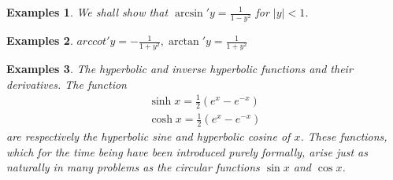 \documentclass[a4paper,12pt]{article} %
\newtheorem{example}{Examples}
\begin{document}
\begin{example}
    We shall show that $\arcsin'y = \frac{1}{1-y^2}$ for $|y| < 1$.
\end{example}

\begin{example}
    $\displaystyle arccot'y = -\frac{1}{1+y^2}, \arctan'y = \frac{1}{1+y^2}$
\end{example}

\begin{example}
    The hyperbolic and inverse hyperbolic functions and their derivatives.
    The function 
    \[
        \begin{split}
        \sinh x = \frac{1}{2}\left(e^x - e^{-x}\right) \\
        \cosh x = \frac{1}{2}\left(e^x - e^{-x}\right)
        \end{split}
        \]
    are respectively the hyperbolic sine and hyperbolic cosine of $x$.
    These functions, which for the time being have been introduced purely 
    formally, arise just as naturally in many problems as the circular 
    functions $\sin x$ and $\cos x$.


\end{example}
\end{document}
